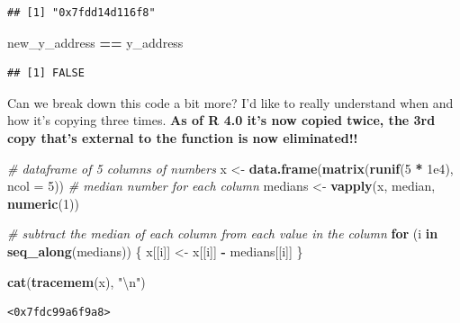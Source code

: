 \documentclass[]{book}
\newenvironment{Shaded}{\begin{snugshade}}{\end{snugshade}}
\newcommand{\CharTok}[1]{\textcolor[rgb]{0.31,0.60,0.02}{#1}}
\newcommand{\CommentTok}[1]{\textcolor[rgb]{0.56,0.35,0.01}{\textit{#1}}}
\newcommand{\ControlFlowTok}[1]{\textcolor[rgb]{0.13,0.29,0.53}{\textbf{#1}}}
\newcommand{\DataTypeTok}[1]{\textcolor[rgb]{0.13,0.29,0.53}{#1}}
\newcommand{\DecValTok}[1]{\textcolor[rgb]{0.00,0.00,0.81}{#1}}
\newcommand{\FloatTok}[1]{\textcolor[rgb]{0.00,0.00,0.81}{#1}}
\newcommand{\KeywordTok}[1]{\textcolor[rgb]{0.13,0.29,0.53}{\textbf{#1}}}
\newcommand{\NormalTok}[1]{#1}
\newcommand{\OperatorTok}[1]{\textcolor[rgb]{0.81,0.36,0.00}{\textbf{#1}}}
\newcommand{\StringTok}[1]{\textcolor[rgb]{0.31,0.60,0.02}{#1}}
\begin{document}
\begin{verbatim}
## [1] "0x7fdd14d116f8"
\end{verbatim}

\begin{Shaded}
\begin{Highlighting}[]
\NormalTok{new_y_address }\OperatorTok{==}\StringTok{ }\NormalTok{y_address}
\end{Highlighting}
\end{Shaded}

\begin{verbatim}
## [1] FALSE
\end{verbatim}

Can we break down this code a bit more? I'd like to really understand when and how it's copying three times. \textbf{As of R 4.0 it's now copied twice, the 3rd copy that's external to the function is now eliminated!!}

\begin{Shaded}
\begin{Highlighting}[]
\CommentTok{# dataframe of 5 columns of numbers}
\NormalTok{x <-}\StringTok{ }\KeywordTok{data.frame}\NormalTok{(}\KeywordTok{matrix}\NormalTok{(}\KeywordTok{runif}\NormalTok{(}\DecValTok{5} \OperatorTok{*}\StringTok{ }\FloatTok{1e4}\NormalTok{), }\DataTypeTok{ncol =} \DecValTok{5}\NormalTok{))}
\CommentTok{# median number for each column}
\NormalTok{medians <-}\StringTok{ }\KeywordTok{vapply}\NormalTok{(x, median, }\KeywordTok{numeric}\NormalTok{(}\DecValTok{1}\NormalTok{))}

\CommentTok{# subtract the median of each column from each value in the column}
\ControlFlowTok{for}\NormalTok{ (i }\ControlFlowTok{in} \KeywordTok{seq_along}\NormalTok{(medians)) \{}
\NormalTok{  x[[i]] <-}\StringTok{ }\NormalTok{x[[i]] }\OperatorTok{-}\StringTok{ }\NormalTok{medians[[i]]}
\NormalTok{\}}
\end{Highlighting}
\end{Shaded}

\begin{Shaded}
\begin{Highlighting}[]
\KeywordTok{cat}\NormalTok{(}\KeywordTok{tracemem}\NormalTok{(x), }\StringTok{"}\CharTok{\textbackslash{}n}\StringTok{"}\NormalTok{)}
\end{Highlighting}
\end{Shaded}

\begin{verbatim}
<0x7fdc99a6f9a8> 
\end{verbatim}
\end{document}
